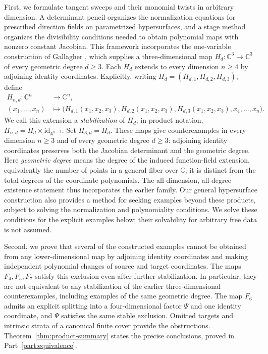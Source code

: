 \documentclass[11pt]{article}
\numberwithin{equation}{section}
\theoremstyle{plain}
\theoremstyle{definition}
\theoremstyle{remark}
\newcommand{\C}{\mathbb{C}}
\newcommand{\A}{\mathbb{A}}
\newcommand{\id}{\mathrm{id}}
\begin{document}
First, we formulate tangent sweeps and their monomial twists in arbitrary
dimension. A determinant pencil organizes the normalization equations for
prescribed direction fields on parametrized hypersurfaces, and a stage method
organizes the divisibility conditions needed to obtain polynomial maps with
nonzero constant Jacobian. This framework incorporates the one-variable
construction of Gallagher \cite{Gallagher2026}, which supplies a
three-dimensional map $H_d:\C^3\to\C^3$ of every geometric degree $d\ge3$.
Each $H_d$ extends to every dimension $n\ge4$ by adjoining identity
coordinates. Explicitly, writing $H_d=(H_{d,1},H_{d,2},H_{d,3})$, define
\[
\begin{split}
 H_{n,d}:\C^n&\longrightarrow\C^n,\\
 (x_1,\ldots,x_n)&\longmapsto
 \bigl(H_{d,1}(x_1,x_2,x_3),H_{d,2}(x_1,x_2,x_3),
 H_{d,3}(x_1,x_2,x_3),x_4,\ldots,x_n\bigr).
\end{split}
\]
We call this extension a \emph{stabilization} of $H_d$; in product notation,
$H_{n,d}=H_d\times\id_{\A^{n-3}}$. Set $H_{3,d}=H_d$.
These maps give counterexamples in every dimension $n\ge3$ and of every
geometric degree $d\ge3$: adjoining identity coordinates preserves both the
Jacobian determinant and the geometric degree. Here \emph{geometric degree} means the degree of the
induced function-field extension, equivalently the number of points in a
general fiber over $\C$; it is distinct from the total degrees of the
coordinate polynomials. The all-dimension, all-degree existence statement
thus incorporates the earlier family. Our general hypersurface construction
also provides a method for seeking examples beyond these products, subject
to solving the normalization and polynomiality conditions. We solve these
conditions for the explicit examples below; their solvability for arbitrary
free data is not assumed.

Second, we prove that several of the constructed examples cannot be obtained
from any lower-dimensional map by adjoining identity coordinates and making
independent polynomial changes of source and target coordinates. The maps
$F_4,F_5,F_7$ satisfy this exclusion even after further stabilization. In
particular, they are not equivalent to any stabilization of the earlier
three-dimensional counterexamples, including examples of the same geometric
degree. The map $F_6$ admits an explicit splitting into a four-dimensional
factor $\Psi$ and one identity coordinate, and $\Psi$ satisfies the same
stable exclusion. Omitted targets and intrinsic strata of a canonical finite
cover provide the obstructions. Theorem~\ref{thm:product-summary} states the
precise conclusions, proved in Part~\ref{part:equivalence}.
\end{document}
